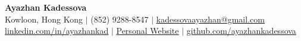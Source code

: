 \documentclass[letterpaper,10.5pt]{article}
\begin{document}

\begin{center}
    \textbf{\Huge Ayazhan Kadessova} \\ \vspace{1pt}
    \small Kowloon, Hong Kong $|$ \small (852) 9288-8547 $|$ \href{mailto:kadessovaayazhan@gmail.com}{\underline{kadessovaayazhan@gmail.com}} \\
    \vspace{1pt}
\href{https://linkedin.com/in/ayazhankad}{\underline{linkedin.com/in/ayazhankad}} $|$
     \href{https://ayazhan-kadessova.netlify.app/}{\underline{Personal Website}} $|$
    \href{https://github.com/ayazhankadessova}{\underline{github.com/ayazhankadessova}}
\end{center}
\end{document}
